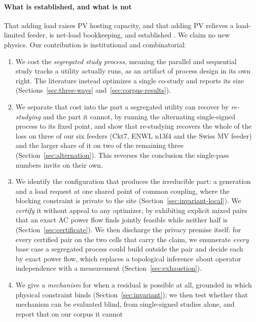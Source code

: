 \documentclass[review,authoryear,12pt]{elsarticle}
\begin{document}
\paragraph{What is established, and what is not}
That adding load raises PV hosting capacity, and that adding PV relieves a
load-limited feeder, is net-load bookkeeping, and established
\citep{capitanescu2015,fachrizal2021,hwang2023}. We claim no new physics. Our
contribution is institutional and combinatorial:
\begin{enumerate}
  \item We cost the \emph{segregated study process}, meaning the parallel and
    sequential study tracks a utility actually runs, as an artifact of
    process design in its own right. The literature instead optimizes a single
    co-study and reports its size (Sections~\ref{sec:three-ways}
    and~\ref{sec:corpus-results}).
  \item We separate that cost into the part a segregated utility can recover
    by \emph{re-studying} and the part it cannot, by running the alternating
    single-signed process to its fixed point, and show that re-studying
    recovers the whole of the loss on three of our six feeders (Ckt7, ENWL
    n13f4 and the Swiss MV feeder) and the larger share of it on two of the
    remaining three (Section~\ref{sec:alternation}). This reverses the
    conclusion the single-pass numbers invite on their own.
  \item We identify the configuration that produces the irreducible part:
    a generation and a load request at one shared point of common coupling,
    where the blocking constraint is private to the site
    (Section~\ref{sec:invariant-local}). We \emph{certify} it without
    appeal to any optimizer, by exhibiting explicit mixed pairs that an exact
    AC power flow finds jointly feasible while neither half is
    (Section~\ref{sec:certificate}). We then discharge the privacy premise
    itself: for every certified pair on the two cells that carry the claim, we
    enumerate \emph{every} base case a segregated process could build outside
    the pair and decide each by exact power flow, which replaces a topological
    inference about operator independence with a measurement
    (Section~\ref{sec:exhaustion}).
  \item We give a \emph{mechanism} for when a residual is possible at all,
    grounded in which physical constraint binds (Section~\ref{sec:invariant});
    we then test whether that mechanism can be evaluated blind, from
    single-signed studies alone, and report that on our corpus it cannot

\end{enumerate}
\end{document}
